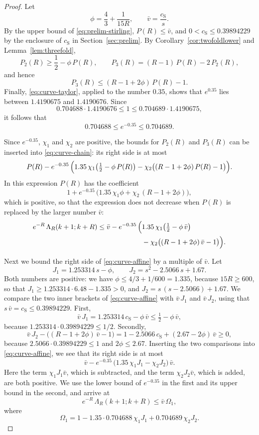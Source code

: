 \documentclass{amsart}
\theoremstyle{definition}
\theoremstyle{remark}
\numberwithin{equation}{section}
\begin{document}
\begin{proof}
Let
\[
\phi=\frac43+\frac{1}{15R},\qquad\bar v=\frac{c_{\mathrm S}}{s}.
\]
By the upper bound of \eqref{eq:prelim-stirling}, $P(R)\le\bar v$, and
$0<c_{\mathrm S}\le0.39894229$ by the enclosure of $c_{\mathrm S}$ in
Section~\ref{sec:prelim}. By Corollary~\ref{cor:twofoldlower} and
Lemma~\ref{lem:threefold},
\[
P_2(R)\ge\frac12-\phi\,P(R),\qquad
P_3(R)=(R-1)\,P(R)-2\,P_2(R),
\]
and hence
\[
P_3(R)\le(R-1+2\phi)\,P(R)-1 .
\]
Finally, \eqref{eq:curve-taylor}, applied to the number $0.35$, shows that
$e^{0.35}$ lies between $1.4190675$ and $1.4190676$. Since
\[
0.704688\cdot1.4190676\le1\le0.704689\cdot1.4190675,
\]
it follows that
\[
0.704688\le e^{-0.35}\le0.704689 .
\]

Since $e^{-0.35}$, $\chi_1$ and $\chi_2$ are positive, the bounds for
$P_2(R)$ and $P_3(R)$ can be inserted into \eqref{eq:curve-chain}: its
right side is at most
\[
P(R)-e^{-0.35}\,\Bigl(1.35\,\chi_1\bigl(\tfrac12-\phi\,P(R)\bigr)
-\chi_2\bigl((R-1+2\phi)\,P(R)-1\bigr)\Bigr).
\]
In this expression $P(R)$ has the coefficient
\[
1+e^{-0.35}\,\bigl(1.35\,\chi_1\phi+\chi_2\,(R-1+2\phi)\bigr),
\]
which is positive, so that
the expression does not decrease when $P(R)$ is replaced by the larger
number $\bar v$:
\begin{equation}\label{eq:curve-affine}
\begin{split}
e^{-R}\,\Lambda_R(k+1;k+R)\le\bar v-e^{-0.35}\,
\Bigl(&1.35\,\chi_1\bigl(\tfrac12-\phi\,\bar v\bigr)\\
&-\chi_2\bigl((R-1+2\phi)\,\bar v-1\bigr)\Bigr).
\end{split}
\end{equation}

Next we bound the right side of \eqref{eq:curve-affine} by a multiple of
$\bar v$. Let
\[
J_1=1.253314\,s-\phi,\qquad J_2=s^2-2.5066\,s+1.67 .
\]
Both numbers are positive: we have $\phi\le4/3+1/600=1.335$, because
$15R\ge600$, so that $J_1\ge1.253314\cdot6.48-1.335>0$, and
$J_2=s\,(s-2.5066)+1.67$. We compare the two inner brackets of
\eqref{eq:curve-affine} with $\bar v\,J_1$ and $\bar v\,J_2$, using that
$s\,\bar v=c_{\mathrm S}\le0.39894229$. First,
\[
\bar v\,J_1=1.253314\,c_{\mathrm S}-\phi\,\bar v\le\tfrac12-\phi\,\bar v,
\]
because $1.253314\cdot0.39894229\le1/2$. Secondly,
\[
\bar v\,J_2-\bigl((R-1+2\phi)\,\bar v-1\bigr)
=1-2.5066\,c_{\mathrm S}+(2.67-2\phi)\,\bar v\ge0,
\]
because $2.5066\cdot0.39894229\le1$ and $2\phi\le2.67$.
Inserting the two comparisons into \eqref{eq:curve-affine}, we see that
its right side is at most
\[
\bar v-e^{-0.35}\,\bigl(1.35\,\chi_1J_1-\chi_2J_2\bigr)\,\bar v .
\]
Here the term
$\chi_1J_1\bar v$, which is subtracted, and the term $\chi_2J_2\bar v$,
which is added, are both positive. We use the lower bound of $e^{-0.35}$
in the
first and its upper bound in the second, and arrive at
\begin{equation}\label{eq:curve-omega}
e^{-R}\,\Lambda_R(k+1;k+R)\le\bar v\,\Omega_1,
\end{equation}
where
\[
\Omega_1=1-1.35\cdot0.704688\,\chi_1J_1+0.704689\,\chi_2J_2 .
\]


\end{proof}
\end{document}

